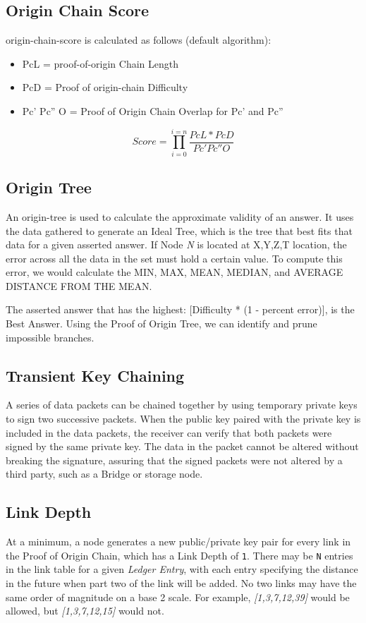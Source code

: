 \documentclass{article}
\begin{document}
\subsection {Origin Chain Score}
\Gls{origin-chain-score} is calculated as follows (default algorithm):

\begin{itemize}
\item PcL = \Gls{proof-of-origin} Chain Length
\item PcD = Proof of \Gls{origin-chain} Difficulty
\item Pc' Pc'' O = Proof of Origin Chain Overlap for Pc' and Pc''
\end{itemize}

\begin{equation*}\tag{1} \label{eq1}
Score = \prod_{i=0}^{i=n} \frac{PcL*PcD}{Pc' Pc'' O}
\end{equation*}

\subsection {Origin Tree}
An \Gls{origin-tree} is used to calculate the approximate validity of an answer. It uses the data gathered to generate an Ideal Tree, which is the tree that best fits that data for a given asserted answer. If Node \textit{N} is located at X,Y,Z,T location, the error across all the data in the set must hold a certain value. To compute this error, we would calculate the MIN, MAX, MEAN, MEDIAN, and AVERAGE DISTANCE FROM THE MEAN.

The asserted answer that has the highest: [Difficulty * (1 - percent error)], is the Best Answer. Using the Proof of Origin Tree, we can identify and prune impossible branches.

\subsection{Transient Key Chaining}

A series of data packets can be chained together by using temporary private keys to sign two successive packets. When the public key paired with the private key is included in the data packets, the receiver can verify that both packets were signed by the same private key. The data in the packet cannot be altered without breaking the signature, assuring that the signed packets were not altered by a third party, such as a Bridge or storage node.

\subsection {Link Depth}
At a minimum, a node generates a new public/private key pair for every link in the Proof of Origin Chain, which has a Link Depth of \texttt{1}. There may be \texttt{N} entries in the link table for a given \textit{Ledger Entry}, with each entry specifying the distance in the future when part two of the link will be added. No two links may have the same order of magnitude on a base 2 scale. For example, \textit{[1,3,7,12,39]} would be allowed, but \textit{[1,3,7,12,15]} would not.
\end{document}
